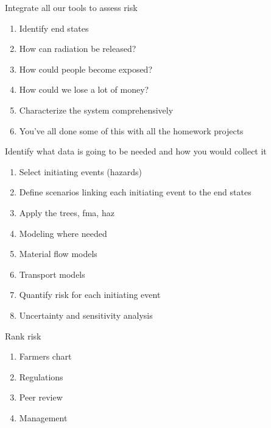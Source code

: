 \documentclass[aspectratio=1610,pdftex,dvipsnames,compress,xcolor={dvipsnames}]{beamer}
\newcommand{\acs}{\acrshort} %
\begin{document}
\begin{frame}{Integrate all our tools to assess risk}
    \begin{enumerate}[series=outerlist,topsep=0pt,itemsep=21pt,leftmargin=*,label=(\arabic*)]
        \item[]Identify end states  
        \item[]How can radiation be released?  
        \item[]How could people become exposed?  
        \item[]How could we lose a lot of money?
        \item[]Characterize the system comprehensively   
        \item[]You've all done some of this with all the homework projects
    \end{enumerate}
\end{frame}


\begin{frame}{Identify what data is going to be needed and how you would collect it}
    \begin{enumerate}[series=outerlist,topsep=0pt,itemsep=11pt,leftmargin=*,label=(\arabic*)]
        \item[]Select initiating events (hazards)
        \item[]Define scenarios linking each initiating event to the end states  
        \item[]Apply the trees, \acs{fma}, \acs{haz}
        \item[]Modeling where needed  
        \item[]Material flow models  
        \item[]Transport models  
        \item[]Quantify risk for each initiating event  
        \item[]Uncertainty and sensitivity analysis
    \end{enumerate}
\end{frame}


\begin{frame}{Rank risk}
    \begin{enumerate}[series=outerlist,topsep=0pt,itemsep=21pt,leftmargin=*,label=(\arabic*)]
        \item[]Farmers chart
        \item[]Regulations
        \item[]Peer review
        \item[]Management
    \end{enumerate}
\end{frame}
\end{document}
